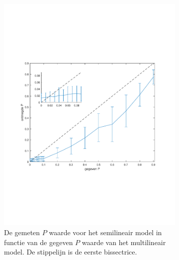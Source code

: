 \documentclass[12pt]{report}
\begin{document}
\begin{figure}
\begin{subfigure}[b]{0.5\textwidth}
\includegraphics[width=\textwidth,trim=0 200 0 175 cm]{PMC_10_100_PP.pdf}
\caption{De gemeten $P$ waarde voor het semilineair model in functie van de gegeven $P$ waarde van het multilineair model. De stippelijn is de eerste bissectrice.\label{fig:PP} }
\end{subfigure}
\begin{subfigure}[b]{0.5\textwidth}

\end{subfigure}
\end{figure}
\end{document}
